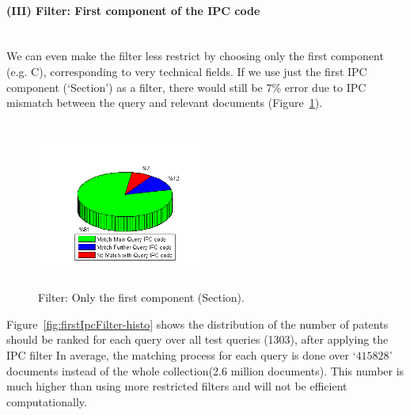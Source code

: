 \paragraph{(III) Filter: First component of the IPC code}
\ \\
 We can even make the filter less restrict by choosing only the first component (e.g. C), corresponding to very technical fields. If we use just the first IPC component (`Section') as a filter, there would still be 7\% error due to IPC mismatch between the query and relevant documents (Figure~\ref{fig:ipc1stElements}). 
\begin{figure}[t!]
   \centering
   \includegraphics[width=0.50\textwidth,height=55mm]{figs/ipc1stElement.png}
   \caption{Filter: Only the first component (Section).}   
   \label{fig:ipc1stElements} 
\end{figure}

Figure~\ref{fig:firstIpcFilter-histo} shows the distribution of the number of patents should be ranked for each query over all test queries (1303), after applying the IPC filter
In average, the matching process for each query is done over `$ 415828 $' documents instead of the whole collection(2.6 million documents). This number is much higher than using more restricted filters and will not be efficient computationally. 

